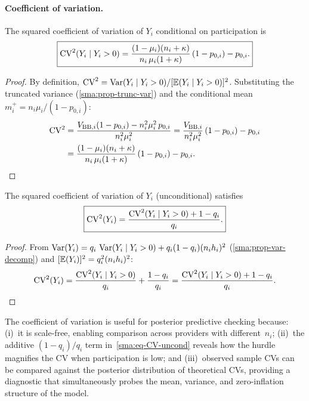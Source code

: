 
\paragraph{Coefficient of variation.}

\begin{proposition}[Conditional CV]\label{sma:prop-CV-cond}
The squared coefficient of variation of $Y_i$ conditional on participation
is
\begin{equation}\label{sma:eq-CV-cond}
  \boxed{
    \textup{CV}^2(Y_i \mid Y_i > 0)
    = \frac{(1-\mu_i)(n_i+\kappa)}{n_i\,\mu_i(1+\kappa)}\,(1-p_{0,i})
      - p_{0,i}.
  }
\end{equation}
\end{proposition}

\begin{proof}
By definition,
$\textup{CV}^2 = \operatorname*{Var}(Y_i \mid Y_i > 0) / [\mathbb{E}(Y_i \mid Y_i > 0)]^2$.
Substituting the truncated variance (\cref{sma:prop-trunc-var}) and the
conditional mean $m_i^{+} = n_i\mu_i/(1-p_{0,i})$:
\begin{align*}
  \textup{CV}^2
  &= \frac{V_{\textup{BB},i}(1-p_{0,i}) - n_i^2\mu_i^2\,p_{0,i}}
         {n_i^2\mu_i^2}
  = \frac{V_{\textup{BB},i}}{n_i^2\mu_i^2}\,(1-p_{0,i}) - p_{0,i} \\
  &= \frac{(1-\mu_i)(n_i+\kappa)}{n_i\,\mu_i(1+\kappa)}\,(1-p_{0,i})
    - p_{0,i}. \qedhere
\end{align*}
\end{proof}

\begin{proposition}[Unconditional CV]\label{sma:prop-CV-uncond}
The squared coefficient of variation of $Y_i$ (unconditional) satisfies
\begin{equation}\label{sma:eq-CV-uncond}
  \boxed{
    \textup{CV}^2(Y_i)
    = \frac{\textup{CV}^2(Y_i \mid Y_i > 0) + 1 - q_i}{q_i}.
  }
\end{equation}
\end{proposition}

\begin{proof}
From $\operatorname*{Var}(Y_i) = q_i\,\operatorname*{Var}(Y_i \mid Y_i > 0) + q_i(1-q_i)(n_i h_i)^2$
(\cref{sma:prop-var-decomp}) and $[\mathbb{E}(Y_i)]^2 = q_i^2(n_i h_i)^2$:
\[
  \textup{CV}^2(Y_i)
  = \frac{\textup{CV}^2(Y_i \mid Y_i > 0)}{q_i}
    + \frac{1-q_i}{q_i}
  = \frac{\textup{CV}^2(Y_i \mid Y_i > 0) + 1 - q_i}{q_i}. \qedhere
\]
\end{proof}

\begin{remark}\label{sma:rem-CV-PPC}
The coefficient of variation is useful for posterior predictive checking
because: \textup{(i)}~it is scale-free, enabling comparison across
providers with different~$n_i$; \textup{(ii)}~the additive $(1-q_i)/q_i$
term in~\eqref{sma:eq-CV-uncond} reveals how the hurdle magnifies the CV
when participation is low; and \textup{(iii)}~observed sample CVs can be
compared against the posterior distribution of theoretical CVs, providing a
diagnostic that simultaneously probes the mean, variance, and
zero-inflation structure of the model.
\end{remark}


